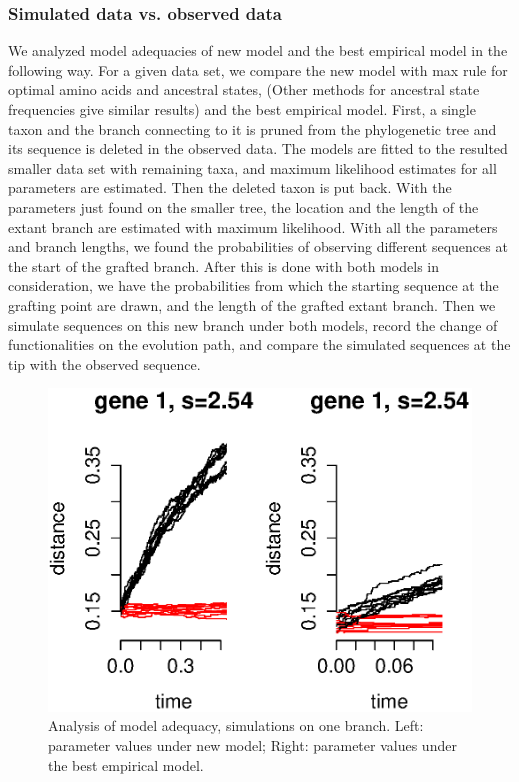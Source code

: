 
\subsubsection{Simulated data vs. observed data}
We analyzed model adequacies of new model and the best empirical model in the following way. 
For a given data set, we compare the new model with max rule for optimal amino acids and ancestral states, (Other methods for ancestral state frequencies give similar results) and the best empirical model. 
First, a single taxon and the branch connecting to it is pruned from the phylogenetic tree and its sequence is deleted in the observed data. 
The models are fitted to the resulted smaller data set with remaining taxa, and maximum likelihood estimates for all parameters are estimated.
Then the deleted taxon is put back. With the parameters just found on the smaller tree, the location and the length of the extant branch are estimated with maximum likelihood. 
With all the parameters and branch lengths, we found the probabilities of observing different sequences at the start of the grafted branch. 
After this is done with both models in consideration, we have the probabilities from which the starting sequence at the grafting point are drawn, and the length of the grafted extant branch. 
Then we simulate sequences on this new branch under both models, record the change of functionalities on the evolution path, and compare the simulated sequences at the tip with the observed sequence. 

\begin{figure}[h]
\centering
\includegraphics[width=\textwidth]{gene1_dis.eps}
\caption{Analysis of model adequacy, simulations on one branch. Left: parameter values under new model; Right: parameter values under the best empirical model.}
\label{fig:simulation}
\end{figure}

